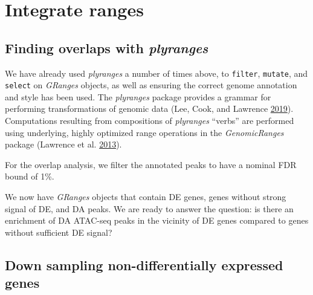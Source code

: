 \documentclass[
]{article}
\newenvironment{Shaded}{}{}
\newcommand{\FloatTok}[1]{\textcolor[rgb]{0.25,0.63,0.44}{#1}}
\newcommand{\KeywordTok}[1]{\textcolor[rgb]{0.00,0.44,0.13}{\textbf{#1}}}
\newcommand{\NormalTok}[1]{#1}
\newcommand{\OperatorTok}[1]{\textcolor[rgb]{0.40,0.40,0.40}{#1}}
\newcommand{\StringTok}[1]{\textcolor[rgb]{0.25,0.44,0.63}{#1}}
\begin{document}
\hypertarget{integrate-ranges}{%
\section{Integrate ranges}\label{integrate-ranges}}

\hypertarget{finding-overlaps-with-plyranges}{%
\subsection{\texorpdfstring{Finding overlaps with \emph{plyranges}}{Finding overlaps with plyranges}}\label{finding-overlaps-with-plyranges}}

We have already used \emph{plyranges} a number of times above, to \texttt{filter},
\texttt{mutate}, and \texttt{select} on \emph{GRanges} objects, as well as ensuring the correct
genome annotation and style has been used. The \emph{plyranges} package provides a
grammar for performing transformations of genomic data (Lee, Cook, and Lawrence \protect\hyperlink{ref-Lee2019}{2019}). Computations
resulting from compositions of \emph{plyranges} ``verbs'' are performed using
underlying, highly optimized range operations in the \emph{GenomicRanges} package
(Lawrence et al. \protect\hyperlink{ref-granges}{2013}).

For the overlap analysis, we filter the annotated peaks to have a nominal FDR
bound of 1\%.

\begin{Shaded}
\end{Shaded}

We now have \emph{GRanges} objects that contain DE genes, genes without strong
signal of DE, and DA peaks. We are ready to answer the question: is there an
enrichment of DA ATAC-seq peaks in the vicinity of DE genes compared to genes
without sufficient DE signal?

\hypertarget{down-sampling-non-differentially-expressed-genes}{%
\subsection{Down sampling non-differentially expressed genes}\label{down-sampling-non-differentially-expressed-genes}}
\end{document}
